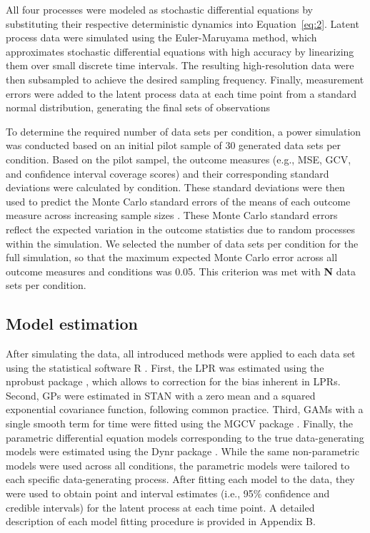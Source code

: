 \documentclass[man, floatsintext]{apa7}
\begin{document}
All four processes were modeled as stochastic differential equations by
substituting their respective deterministic dynamics into Equation~\ref{eq:2}.
Latent process data were simulated using the Euler-Maruyama method, which
approximates stochastic differential equations with high accuracy by
linearizing them over small discrete time intervals. The resulting
high-resolution data were then subsampled to achieve the desired sampling
frequency. Finally, measurement errors were added to the
latent process data at each time point from a standard normal distribution,
generating the final sets of observations

To determine the required number of data sets per condition, a power simulation
was conducted based on an initial pilot sample of 30 generated data sets per
condition. Based on the pilot sampel, the outcome measures
(e.g., MSE, GCV, and confidence interval coverage scores) and their
corresponding standard deviations were calculated by condition.
These standard deviations were then used to
predict the Monte Carlo standard errors of the means of each outcome measure
across increasing sample sizes \parencite{siepe_simulation_2023}.
These Monte Carlo standard errors reflect the
expected variation in the outcome statistics due to random processes within the
simulation. We selected the number of data sets per condition for the full
simulation, so that the
maximum expected Monte Carlo error across all outcome measures
and conditions was 0.05. This criterion was met with \textbf{N} data sets per
condition.

\subsection{Model estimation}

After simulating the data, all introduced methods were applied to each data set
using the statistical software R \parencite{R-base}. First, the LPR was
estimated using the nprobust package \parencite{R-nprobust}, which allows to
correction for the bias inherent in LPRs. Second, GPs were estimated in STAN
\parencite{R-cmdstanr} with a zero mean and a squared exponential covariance
function, following common practice. Third, GAMs with a single smooth term for
time were fitted using the MGCV package \parencite{R-mgcv_a}. Finally,
the parametric differential equation models corresponding to the true
data-generating models were estimated using the Dynr package
\parencite{R-dynr}. While the same non-parametric models were used across all
conditions, the parametric models were tailored to each specific
data-generating process. After fitting each model to
the data, they were used to obtain point and interval estimates (i.e.,
95\% confidence and credible intervals) for the latent process at each time
point. A detailed description of each model fitting procedure
is provided in Appendix B.
\end{document}
